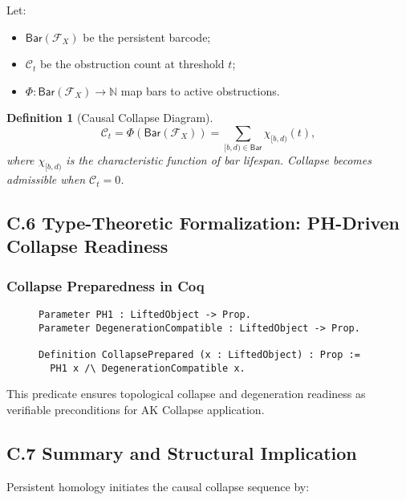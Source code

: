 \documentclass[11pt]{article}
\newtheorem{definition}[theorem]{Definition}
\begin{document}
Let:

\begin{itemize}
    \item \( \mathsf{Bar}(\mathcal{F}_X) \) be the persistent barcode;
    \item \( \mathcal{C}_t \) be the obstruction count at threshold \( t \);
    \item \( \Phi : \mathsf{Bar}(\mathcal{F}_X) \to \mathbb{N} \) map bars to active obstructions.
\end{itemize}

\begin{definition}[Causal Collapse Diagram]
\[
\mathcal{C}_t = \Phi(\mathsf{Bar}(\mathcal{F}_X)) = \sum_{[b,d) \in \mathsf{Bar}} \chi_{[b,d)}(t),
\]
where \( \chi_{[b,d)} \) is the characteristic function of bar lifespan. Collapse becomes admissible when \( \mathcal{C}_t = 0 \).
\end{definition}

\subsection*{C.6 Type-Theoretic Formalization: PH-Driven Collapse Readiness}

\subsubsection*{Collapse Preparedness in Coq}

\begin{figure}[h]
\centering
\begin{lstlisting}[language=Coq, caption=Persistent Homology Driven Collapse Readiness]
Parameter PH1 : LiftedObject -> Prop.
Parameter DegenerationCompatible : LiftedObject -> Prop.

Definition CollapsePrepared (x : LiftedObject) : Prop :=
  PH1 x /\ DegenerationCompatible x.
\end{lstlisting}
\end{figure}

This predicate ensures topological collapse and degeneration readiness as verifiable preconditions for AK Collapse application.

\subsection*{C.7 Summary and Structural Implication}

Persistent homology initiates the causal collapse sequence by:
\end{document}
